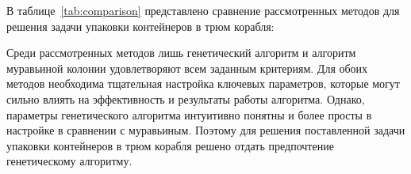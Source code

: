 В таблице~\ref{tab:comparison} представлено сравнение рассмотренных методов для решения задачи упаковки контейнеров в трюм корабля:
\begin{table}[h!]
	\centering
\end{table}




Среди рассмотренных методов лишь генетический алгоритм и алгоритм муравьиной колонии удовлетворяют всем заданным критериям. Для обоих методов необходима тщательная настройка ключевых параметров, которые могут сильно влиять на эффективность и результаты работы алгоритма. Однако, параметры генетического алгоритма интуитивно понятны и более просты в настройке в сравнении с муравьиным. Поэтому для решения поставленной задачи упаковки контейнеров в трюм корабля решено отдать предпочтение генетическому алгоритму.



